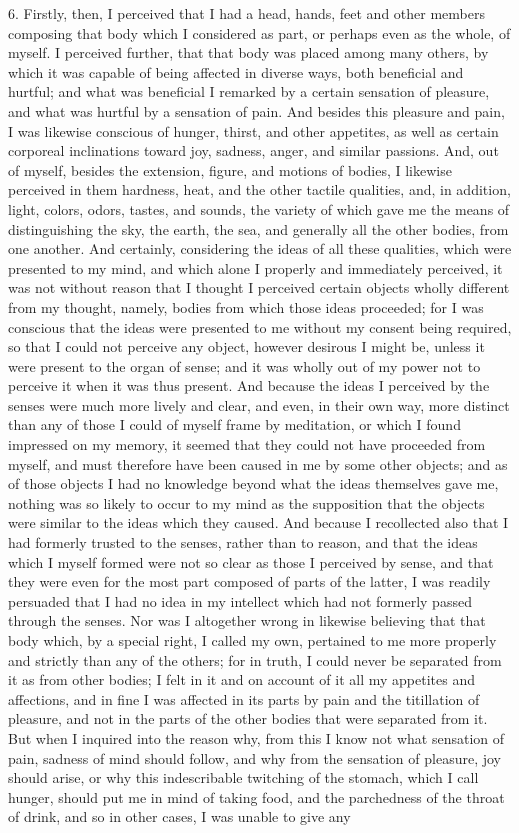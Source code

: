6. Firstly, then, I perceived that I had a head, hands, feet and other members composing that body which I considered as part, or perhaps even as the whole, of myself. I perceived further, that that body was placed among many others, by which it was capable of being affected in diverse ways, both beneficial and hurtful; and what was beneficial I remarked by a certain sensation of pleasure, and what was hurtful by a sensation of pain. And besides this pleasure and pain, I was likewise conscious of hunger, thirst, and other appetites, as well as certain corporeal inclinations toward joy, sadness, anger, and similar passions. And, out of myself, besides the extension, figure, and motions of bodies, I likewise perceived in them hardness, heat, and the other tactile qualities, and, in addition, light, colors, odors, tastes, and sounds, the variety of which gave me the means of distinguishing the sky, the earth, the sea, and generally all the other bodies, from one another. And certainly, considering the ideas of all these qualities, which were presented to my mind, and which alone I properly and immediately perceived, it was not without reason that I thought I perceived certain objects wholly different from my thought, namely, bodies from which those ideas proceeded; for I was conscious that the ideas were presented to me without my consent being required, so that I could not perceive any object, however desirous I might be, unless it were present to the organ of sense; and it was wholly out of my power not to perceive it when it was thus present. And because the ideas I perceived by the senses were much more lively and clear, and even, in their own way, more distinct than any of those I could of myself frame by meditation, or which I found impressed on my memory, it seemed that they could not have proceeded from myself, and must therefore have been caused in me by some other objects; and as of those objects I had no knowledge beyond what the ideas themselves gave me, nothing was so likely to occur to my mind as the supposition that the objects were similar to the ideas which they caused. And because I recollected also that I had formerly trusted to the senses, rather than to reason, and that the ideas which I myself formed were not so clear as those I perceived by sense, and that they were even for the most part composed of parts of the latter, I was readily persuaded that I had no idea in my intellect which had not formerly passed through the senses. Nor was I altogether wrong in likewise believing that that body which, by a special right, I called my own, pertained to me more properly and strictly than any of the others; for in truth, I could never be separated from it as from other bodies; I felt in it and on account of it all my appetites and affections, and in fine I was affected in its parts by pain and the titillation of pleasure, and not in the parts of the other bodies that were separated from it. But when I inquired into the reason why, from this I know not what sensation of pain, sadness of mind should follow, and why from the sensation of pleasure, joy should arise, or why this indescribable twitching of the stomach, which I call hunger, should put me in mind of taking food, and the parchedness of the throat of drink, and so in other cases, I was unable to give any 